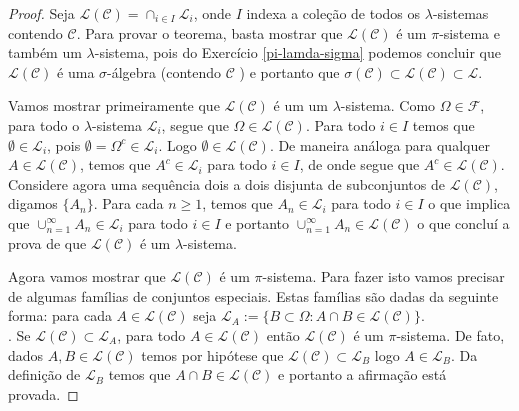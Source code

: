 \begin{proof}
    Seja $ \mathcal{L}(\mathcal{C}) = \cap_{i\in I} \mathcal{L}_i $, 
    onde $I$ indexa a coleção de todos os $\lambda$-sistemas 
    contendo $\mathcal{C}$. 
    Para provar o teorema, basta mostrar que 
    $\mathcal{L}(\mathcal{C} )$ é um $\pi$-sistema e também 
    um $\lambda$-sistema, pois do Exercício \ref{pi-lamda-sigma} 
    podemos concluir que $ \mathcal{L}(\mathcal{C})$ 
    é uma $\sigma$-álgebra (contendo $\mathcal{C} $ )
    e portanto que
    $\sigma(\mathcal{C}) \subset \mathcal{L}(\mathcal{C})\subset \mathcal{L}$.
    
    Vamos mostrar primeiramente que $\mathcal{L}(\mathcal{C})$ é um um  
    $\lambda$-sistema. Como $\Omega \in \mathcal{F}$, para todo o $\lambda$-sistema  
    $\mathcal{L}_i$, segue que $\Omega \in \mathcal{L}(\mathcal{C})$. 
    Para todo $i\in I$ temos que 
    $\emptyset \in \mathcal{L}_i$, pois $\emptyset = \Omega^c \in \mathcal{L}_i$. 
    Logo $\emptyset\in \mathcal{L}(\mathcal{C})$.
    De maneira análoga para qualquer $A \in \mathcal{L}(\mathcal{C})$, temos que 
    $A^c \in \mathcal{L}_i$ para todo $i\in I$, de onde segue que
    $A^c \in \mathcal{L}(\mathcal{C})$.
    Considere agora uma sequência dois a dois disjunta de subconjuntos de 
    $\mathcal{L}(\mathcal{C})$, digamos $\{A_n\}$. 
    Para cada $n\ge 1$, temos que $A_n \in\mathcal{L}_i$ para todo $i\in I$ 
    o que implica que $\cup_{n=1}^{\infty} A_n \in \mathcal{L}_i$ para todo $i\in I$ 
    e portanto $\cup_{n=1}^{\infty} A_n \in  \mathcal{L}(\mathcal{C})$ 
    o que concluí a prova de que
    $\mathcal{L}(\mathcal{C})$ é um $\lambda$-sistema. 
    
    Agora vamos mostrar que $ \mathcal{L}(\mathcal{C})$ é um $\pi$-sistema. 
    Para fazer isto vamos precisar de algumas famílias de conjuntos especiais.  
    Estas famílias são dadas da seguinte forma: para cada 
    $A \in  \mathcal{L}(\mathcal{C})$ seja  
    $\mathcal{L}_A := \{ B \subset \Omega : A \cap B \in  \mathcal{L}(\mathcal{C})\}$. 
    \\
    . 
    Se $ \mathcal{L}(\mathcal{C}) \subset  \mathcal{L}_A$, 
    para todo $A \in  \mathcal{L}(\mathcal{C})$ 
    então $\mathcal{L}(\mathcal{C})$ é um $\pi$-sistema.
	De fato, dados 
	$A,B\in\mathcal{L}(\mathcal{C})$ temos por hipótese que
	$\mathcal{L}(\mathcal{C}) \subset  \mathcal{L}_B$ logo 
	$A\in\mathcal{L}_B$. Da definição de $\mathcal{L}_B$ temos que
	$A\cap B\in \mathcal{L}(\mathcal{C})$ e portanto a afirmação está provada.
	

\end{proof}
